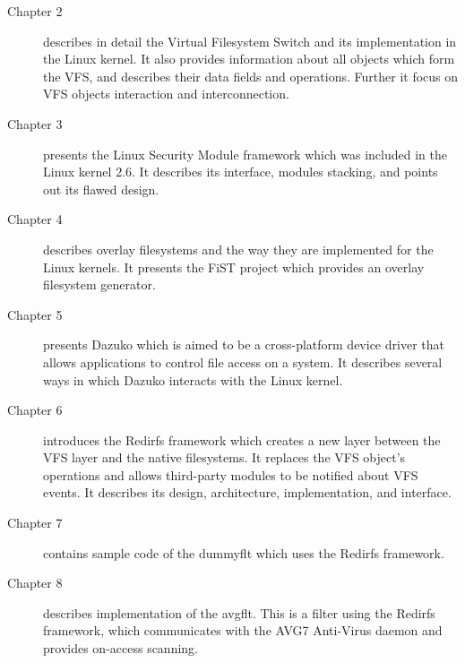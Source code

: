 \begin{description}
	\item [Chapter 2]
		describes in detail the Virtual Filesystem Switch and its
		implementation in the Linux kernel. It also provides information about
		all objects which form the VFS, and describes their data fields and
		operations. Further it focus on VFS objects interaction and
		interconnection.
		
	\item [Chapter 3]
		presents the Linux Security Module framework which was included in the
		Linux kernel 2.6. It describes its interface, modules stacking, and
		points out its flawed design.

	\item [Chapter 4]
		describes overlay filesystems and the way they are implemented for the
		Linux kernels. It presents the FiST project which provides an overlay
		filesystem generator.

	\item [Chapter 5]
		presents Dazuko which is aimed to be a cross-platform device driver
		that allows applications to control file access on a system. It
		describes several ways in which Dazuko interacts with the Linux
		kernel.

	\item [Chapter 6]
		introduces the Redirfs framework which creates a new layer between the
		VFS layer and the native filesystems. It replaces the VFS object's
		operations and allows third-party modules to be notified about VFS
		events. It describes its design, architecture, implementation, and
		interface.

	\item [Chapter 7] 
		contains sample code of the dummyflt which uses the Redirfs framework.

	\item [Chapter 8] 
		describes implementation of the avgflt. This is a filter using the
		Redirfs framework, which communicates with the AVG7 Anti-Virus daemon
		and provides on-access scanning.
\end{description}
